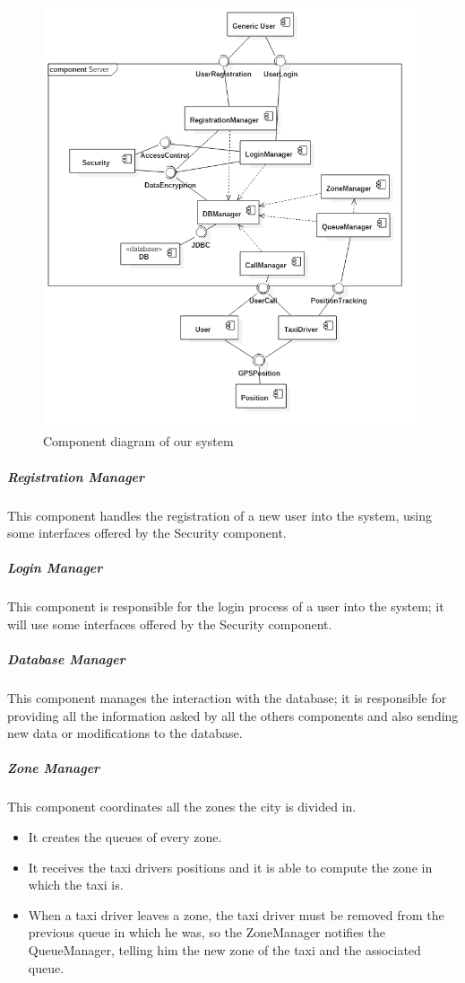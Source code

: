\begin{figure}[H]
    \centering
    \includegraphics[width=14cm]{./Images/ComponentDiagram.png}
    \caption{Component diagram of our system}
    \label{fig:component-diagram}
\end{figure}


\subparagraph{Registration Manager}
This component handles the registration of a new user into the system, using some interfaces offered by the Security component.

\subparagraph{Login Manager}
This component is responsible for the login process of a user into the system; it will use some interfaces offered by the Security component.

\subparagraph{Database Manager}
This component manages the interaction with the database; it is responsible for providing all the information asked by all the others components and also sending new data or modifications to the database.

\subparagraph{Zone Manager}
This component coordinates all the zones the city is divided in.
\begin{itemize}
    \item It creates the queues of every zone.
    \item It receives the taxi drivers positions and it is able to compute the zone in which the taxi is.
    \item When a taxi driver leaves a zone, the taxi driver must be removed from the previous queue in which he was, so the ZoneManager notifies the QueueManager, telling him the new zone of the taxi and the associated queue.
\end{itemize}


